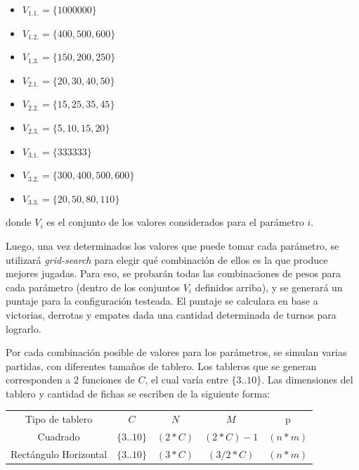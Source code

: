 \documentclass[12pt,a4paper]{article}
\begin{document}
        \begin{itemize}
            \item $V_{1.1.} =  \{1000000\} $
            \item $V_{1.2.} =  \{400, 500, 600\} $
            \item $V_{1.3.} =  \{150, 200, 250\} $
            \item $V_{2.1.} =  \{20, 30, 40, 50\} $
            \item $V_{2.2.} =  \{15, 25, 35, 45\} $
            \item $V_{2.3.} =  \{5, 10, 15, 20\} $
            \item $V_{3.1.} =  \{333333\} $
            \item $V_{3.2.} =  \{300, 400, 500, 600\} $
            \item $V_{3.3.} =  \{20, 50, 80, 110\} $
        \end{itemize}
    donde $V_{i}$ es el conjunto de los valores considerados para el parámetro $i$.
    
    Luego, una vez determinados los valores que puede tomar cada parámetro, se utilizará \textit{grid-search} para elegir qué combinación de ellos es la que produce mejores jugadas. Para eso, se probarán todas las combinaciones de pesos para cada parámetro (dentro de los conjuntos $V_{i}$ definidos arriba), y se generará un puntaje para la configuración testeada. El puntaje se calculara en base a victorias, derrotas y empates dada una cantidad determinada de turnos para lograrlo.
    
    Por cada combinación posible de valores para los parámetros, se simulan varias partidas, con diferentes tamaños de tablero. Los tableros que se generan corresponden a 2 funciones de $C$, el cual varía entre $\{3..10\}$. Las dimensiones del tablero y cantidad de fichas se escriben de la siguiente forma:
    
    \begin{center}
		\begin{tabular}{ | c || c | c | c | c | }
		\hline
		Tipo de tablero &  $C$ &  $N$ & $M$ & p \\ \hhline{|=#=|=|=|=|}
		    Cuadrado & $\{3..10\}$ &  $(2 * C)$ & $(2 * C) - 1$ & $ (n * m)$ \\ \hline
		    Rectángulo Horizontal & $\{3..10\}$ &  $(3 * C)$ &  $(3/2 * C)$ & $ (n * m)$ \\ \hline
		\end{tabular}
    \end{center}
    
\end{document}
